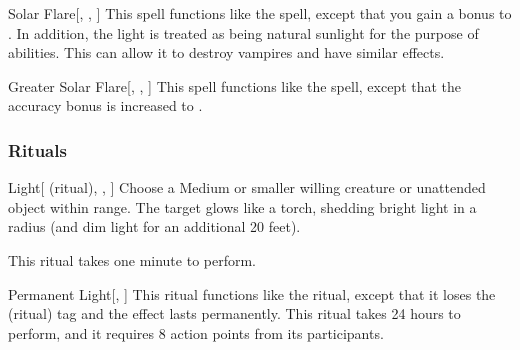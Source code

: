 \lowercase{\hypertarget{spell:Solar Flare}{}}\label{spell:Solar Flare}
\begin{apability}[\nth{4}]{\hypertarget{spell:Solar Flare}{Solar Flare}}[, , ]
This spell functions like the  spell, except that you gain a  bonus to .
In addition, the light is treated as being natural sunlight for the purpose of abilities.
This can allow it to destroy vampires and have similar effects.
\end{apability}
\vspace{0.25em}



\lowercase{\hypertarget{spell:Greater Solar Flare}{}}\label{spell:Greater Solar Flare}
\begin{apability}[\nth{7}]{\hypertarget{spell:Greater Solar Flare}{Greater Solar Flare}}[, , ]
This spell functions like the  spell, except that the accuracy bonus is increased to .
\end{apability}
\vspace{0.25em}



\subsubsection{Rituals}


\lowercase{\hypertarget{spell:Light}{}}\label{spell:Light}
\begin{attuneability}[\nth{1}]{\hypertarget{spell:Light}{Light}}[ (ritual), , ]
Choose a Medium or smaller willing creature or unattended object within \rngclose range.
The target glows like a torch, shedding bright light in a \areamed radius (and dim light for an additional 20 feet).

This ritual takes one minute to perform.
\end{attuneability}
\vspace{0.25em}



\lowercase{\hypertarget{spell:Permanent Light}{}}\label{spell:Permanent Light}
\begin{apability}[\nth{2}]{\hypertarget{spell:Permanent Light}{Permanent Light}}[, ]
This ritual functions like the  ritual, except that it loses the  (ritual) tag and the effect lasts permanently.
This ritual takes 24 hours to perform, and it requires 8 action points from its participants.
\end{apability}
\vspace{0.25em}


